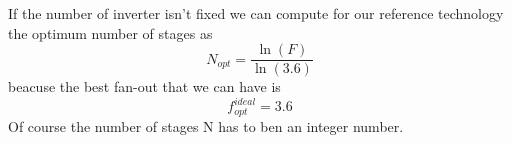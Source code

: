 \vspace{5mm}

If the number of inverter isn't fixed we can compute for our reference technology the optimum number of stages as 
\begin{equation}
N_{opt}=\frac{\ln(F)}{\ln(3.6)}
\end{equation}
beacuse the best fan-out that we can have is 
\begin{equation}
f_{opt}^{ideal}=3.6
\end{equation}
Of course the number of stages N has to ben an integer number.\\


